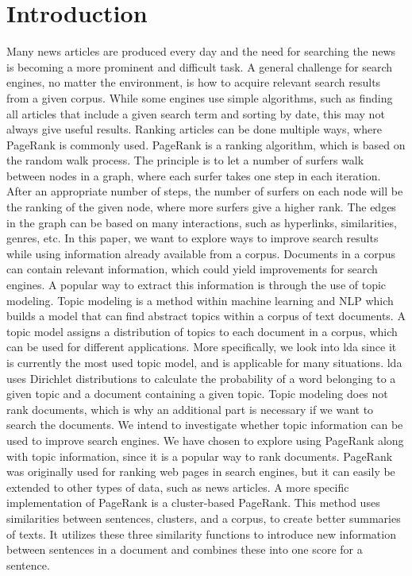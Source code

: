\section{Introduction} 

Many news articles are produced every day and the need for searching the news is becoming a more prominent and difficult task.
A general challenge for search engines, no matter the environment, is how to acquire relevant search results from a given corpus. 
While some engines use simple algorithms, such as finding all articles that include a given search term and sorting by date, this may not always give useful results.
Ranking articles can be done multiple ways, where PageRank is commonly used\cite{google_pagerank2006}.
PageRank\cite{pagerank_1999} is a ranking algorithm, which is based on the random walk process.
The principle is to let a number of surfers walk between nodes in a graph, where each surfer takes one step in each iteration.
After an appropriate number of steps, the number of surfers on each node will be the ranking of the given node, where more surfers give a higher rank.
The edges in the graph can be based on many interactions, such as hyperlinks, similarities, genres, etc.
In this paper, we want to explore ways to improve search results while using information already available from a corpus.
Documents in a corpus can contain relevant information, which could yield improvements for search engines.
A popular way to extract this information is through the use of topic modeling.
Topic modeling is a method within machine learning and \gls{NLP} which builds a model that can find abstract topics within a corpus of text documents.
A topic model assigns a distribution of topics to each document in a corpus, which can be used for different applications.
More specifically, we look into \gls{lda} since it is currently the most used topic model, and is applicable for many situations\cite{lda}.
\gls{lda} uses Dirichlet distributions to calculate the probability of a word belonging to a given topic and a document containing a given topic.
Topic modeling does not rank documents, which is why an additional part is necessary if we want to search the documents.
We intend to investigate whether topic information can be used to improve search engines.
We have chosen to explore using PageRank along with topic information, since it is a popular way to rank documents.
PageRank was originally used for ranking web pages in search engines, but it can easily be extended to other types of data, such as news articles.
A more specific implementation of PageRank is a cluster-based PageRank\cite{ClusterPageRank}.
This method uses similarities between sentences, clusters, and a corpus, to create better summaries of texts.
It utilizes these three similarity functions to introduce new information between sentences in a document and combines these into one score for a sentence.

